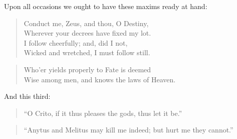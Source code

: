 Upon all occasions we ought to have these maxims ready at hand:

\begin{quote}
  Conduct me, Zeus, and thou, O Destiny, \\
  Wherever your decrees have fixed my lot. \\
  I follow cheerfully; and, did I not, \\
  Wicked and wretched, I must follow still.\footnotemark
\end{quote}

\begin{quote}
  Who'er yields properly to Fate is deemed \\
  Wise among men, and knows the laws of Heaven.\footnotemark
\end{quote}

And this third:

\begin{quote}
  ``O Crito, if it thus pleases the gods, thus let it be.''\footnotemark
\end{quote}

\begin{quote}
  ``Anytus and Melitus may kill me indeed; but hurt me they cannot.''\footnotemark
\end{quote}
